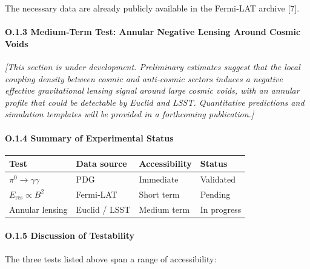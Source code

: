 \documentclass[11pt]{article}
\begin{document}
The necessary data are already publicly available in the Fermi‑LAT
archive {[}7{]}.

\hypertarget{o.1.3-mediumterm-test-annular-negative-lensing-around-cosmic-voids}{%
\paragraph{O.1.3 Medium‑Term Test: Annular Negative Lensing Around
Cosmic
Voids}\label{o.1.3-mediumterm-test-annular-negative-lensing-around-cosmic-voids}}

\emph{{[}This section is under development. Preliminary estimates
suggest that the local coupling density between cosmic and anti‑cosmic
sectors induces a negative effective gravitational lensing signal around
large cosmic voids, with an annular profile that could be detectable by
Euclid and LSST. Quantitative predictions and simulation templates will
be provided in a forthcoming publication.{]}}

\hypertarget{o.1.4-summary-of-experimental-status}{%
\paragraph{O.1.4 Summary of Experimental
Status}\label{o.1.4-summary-of-experimental-status}}

\begin{longtable}[]{@{}llll@{}}
\toprule
Test & Data source & Accessibility & Status \\
\midrule
\endhead
\(\pi^0 \to \gamma\gamma\) & PDG & Immediate & Validated \\
\(E_{\text{res}} \propto B^2\) & Fermi‑LAT & Short term & Pending \\
Annular lensing & Euclid / LSST & Medium term & In progress \\
\bottomrule
\end{longtable}

\hypertarget{o.1.5-discussion-of-testability}{%
\paragraph{O.1.5 Discussion of
Testability}\label{o.1.5-discussion-of-testability}}

The three tests listed above span a range of accessibility:
\end{document}
